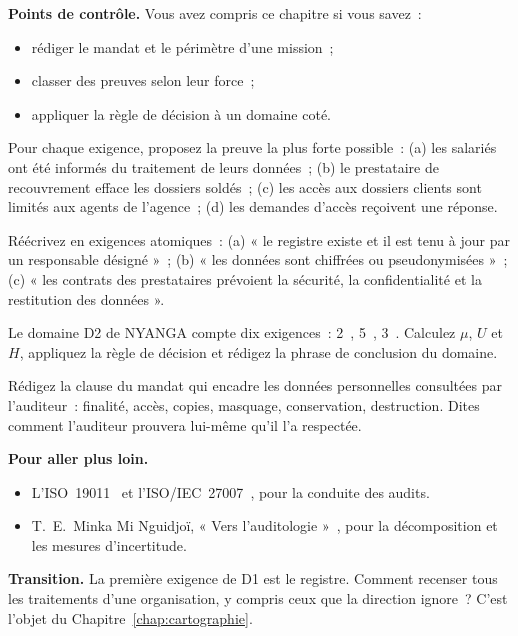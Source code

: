 \begin{boxinfo}
\textbf{Points de contrôle.} Vous avez compris ce chapitre si vous savez~:
\begin{itemize}
    \item rédiger le mandat et le périmètre d'une mission~;
    \item classer des preuves selon leur force~;
    \item appliquer la règle de décision à un domaine coté.
\end{itemize}
\end{boxinfo}

\begin{boxexo}[title={\ding{45}\quad Exercice~3.1. Quelle preuve \niveaubase}]
Pour chaque exigence, proposez la preuve la plus forte possible~: (a) les
salariés ont été informés du traitement de leurs données~; (b) le
prestataire de recouvrement efface les dossiers soldés~; (c) les accès aux
dossiers clients sont limités aux agents de l'agence~; (d) les demandes
d'accès reçoivent une réponse.
\end{boxexo}

\begin{boxexo}[title={\ding{45}\quad Exercice~3.2. Rendre atomique \niveaumoyen}]
Réécrivez en exigences atomiques~: (a) « le registre existe et il est tenu à
jour par un responsable désigné »~; (b) « les données sont chiffrées ou
pseudonymisées »~; (c) « les contrats des prestataires prévoient la
sécurité, la confidentialité et la restitution des données ».
\end{boxexo}

\begin{boxexo}[title={\ding{45}\quad Exercice~3.3. Conclure sur D2 \niveaumoyen}]
Le domaine D2 de NYANGA compte dix exigences~: 2~\OUI{}, 5~\NON{}, 3~\NEK{}.
Calculez $\mu$, $U$ et $H$, appliquez la règle de décision et rédigez la
phrase de conclusion du domaine.
\end{boxexo}

\begin{boxexo}[title={\ding{45}\quad Exercice~3.4. L'audit comme traitement \niveauexpert}]
Rédigez la clause du mandat qui encadre les données personnelles consultées
par l'auditeur~: finalité, accès, copies, masquage, conservation,
destruction. Dites comment l'auditeur prouvera lui-même qu'il l'a respectée.
\end{boxexo}

\bigskip

\begin{boxinfo}
\textbf{Pour aller plus loin.}
\begin{itemize}
    \item L'ISO~19011~\cite{iso19011_2018} et l'ISO/IEC~27007~\cite{iso27007},
          pour la conduite des audits.
    \item T.~E.~Minka Mi Nguidjoï, « Vers l'auditologie »~\cite{minka2026auditologie},
          pour la décomposition et les mesures d'incertitude.
\end{itemize}
\end{boxinfo}

\begin{boxinfo}
\textbf{Transition.} La première exigence de D1 est le registre. Comment
recenser tous les traitements d'une organisation, y compris ceux que la
direction ignore~? C'est l'objet du Chapitre~\ref{chap:cartographie}.
\end{boxinfo}

